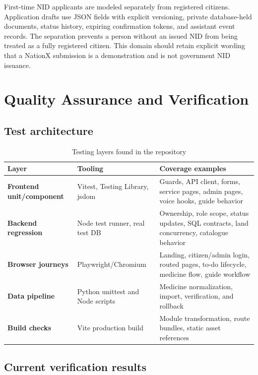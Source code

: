 \documentclass[12pt,a4paper,oneside]{report}
\begin{document}
First-time NID applicants are modeled separately from registered citizens. Application drafts use
JSON fields with explicit versioning, private database-held documents, status history, expiring
confirmation tokens, and assistant event records. The separation prevents a person without an
issued NID from being treated as a fully registered citizen. This domain should retain explicit
wording that a NationX submission is a demonstration and is not government NID issuance.

\chapter{Quality Assurance and Verification}

\section{Test architecture}

\begin{table}[htbp]
\centering
\caption{Testing layers found in the repository}
\begin{tabularx}{\textwidth}{>{\bfseries}p{} p{} X}
\toprule
Layer & Tooling & Coverage examples\\
\midrule
Frontend unit/component & Vitest, Testing Library, jsdom & Guards, API client, forms, service pages, admin pages, voice hooks, guide behavior\\
Backend regression & Node test runner, real test DB & Ownership, role scope, status updates, SQL contracts, land concurrency, catalogue behavior\\
Browser journeys & Playwright/Chromium & Landing, citizen/admin login, routed pages, to-do lifecycle, medicine flow, guide workflow\\
Data pipeline & Python unittest and Node scripts & Medicine normalization, import, verification, and rollback\\
Build checks & Vite production build & Module transformation, route bundles, static asset references\\
\bottomrule
\end{tabularx}
\end{table}

\section{Current verification results}
\end{document}
